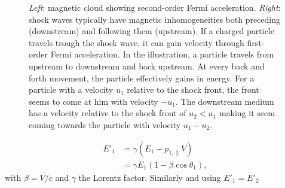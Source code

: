 \begin{figure}[ht]
\begin{minipage}{6in}
  \centering
  \hspace*{.1in}
\end{minipage}
\caption{\textit{Left}: magnetic cloud showing second-order Fermi acceleration. \textit{Right}: shock waves typically have magnetic inhomogeneities both preceding (downstream) and following them (upstream). If a charged particle travels trough the shock wave, it can gain velocity through first-order Fermi acceleration. In the illustration, a particle travels from upstream to downstream and back upstream. At every back and forth movement, the particle effectively gains in energy. For a particle with a velocity $u_1$ relative to the shock front, the front seems to come at him with velocity $-u_1$. The downstream medium has a velocity relative to the shock front of $u_2 < u_1$ making it seem coming towards the particle with velocity $u_1-u_2$.}
%
\label{fig:cloud}
\end{figure}

\begin{equation}
\begin{split}
E'_1 &= \gamma \left(E_1 - p_{1,\parallel} V\right) \\
&= \gamma E_1 \left(1-\beta \cos \theta_1\right),
\end{split}
\end{equation}
with $\beta = V/c$ and $\gamma$ the Lorentz factor. Similarly and using $E'_1 = E'_2$

